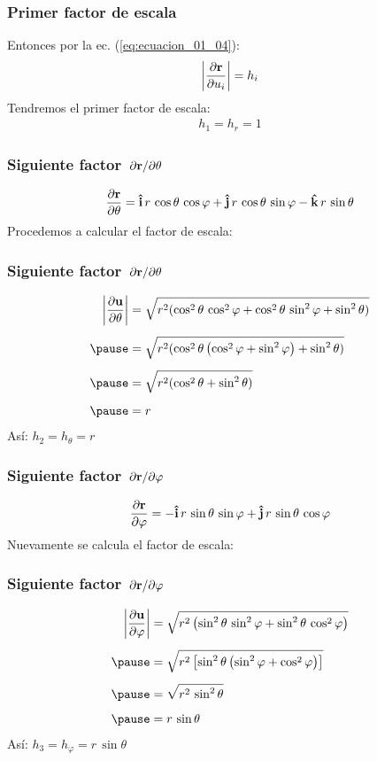 \documentclass[12pt]{beamer}
\begin{document}
\begin{frame}
\frametitle{Primer factor de escala}
Entonces por la ec. (\ref{eq:ecuacion_01_04}):
\pause
\begin{align*}
\abs{\pdv{\vb{r}}{u_{i}}} = h_{i}
\end{align*}
Tendremos el primer factor de escala:
\pause
\begin{align*}
h_{1} = h_{r} = 1
\end{align*}
\end{frame}
\begin{frame}
\frametitle{Siguiente factor $\pdv*{\vb{r}}{\theta}$}
\begin{align*}
\pdv{\vb{r}}{\theta} = \vu{i} \, r \, \cos \theta \, \cos \varphi + \vu{j} \, r \, \cos \theta \, \sin \varphi - \vu{k} \, r \, \sin \theta
\end{align*}
Procedemos a calcular el factor de escala:
\end{frame}
\begin{frame}
\frametitle{Siguiente factor $\pdv*{\vb{r}}{\theta}$}
\begin{eqnarray*}
\begin{aligned}
\abs{\pdv{\vb{u}}{\theta}} &= \sqrt{r^{2} (\cos^{2} \theta \, \cos^{2} \varphi + \cos^{2} \theta \, \sin^{2} \varphi + \sin^{2} \theta)} \\[0.5em] \pause
&= \sqrt{r^{2} (\cos^{2} \theta \left(\cos^{2} \varphi + \sin^{2} \varphi \right) + \sin^{2} \theta)} \\[0.5em] \pause
&= \sqrt{r^{2} (\cos^{2} \theta + \sin^{2} \theta)} \\[0.5em] \pause
&= r
\end{aligned}
\end{eqnarray*}
\pause
Así: $h_{2} = h_{\theta} = r$
\end{frame}
\begin{frame}
\frametitle{Siguiente factor $\pdv*{\vb{r}}{\varphi}$}
\begin{align*}
\pdv{\vb{r}}{\varphi} = - \vu{i} \, r \, \sin \theta \, \sin \varphi + \vu{j} \, r \, \sin \theta \, \cos \varphi
\end{align*}
Nuevamente se calcula el factor de escala:
\end{frame}
\begin{frame}
\frametitle{Siguiente factor $\pdv*{\vb{r}}{\varphi}$}
\begin{eqnarray*}
\begin{aligned}
\abs{\pdv{\vb{u}}{\varphi}} &= \sqrt{r^{2} \left( \sin^{2} \theta \, \sin^{2} \varphi + \sin^{2} \theta \, \cos^{2} \varphi \right)} \\[0.5em] \pause
&= \sqrt{r^{2} \left[ \sin^{2} \theta \left( \sin^{2} \varphi + \cos^{2} \varphi \right) \right]} \\[0.5em] \pause
&= \sqrt{r^{2} \, \sin^{2} \theta} \\[0.5em] \pause
&= r \, \sin \theta
\end{aligned}
\end{eqnarray*}
\pause
Así: $h_{3} = h_{\varphi} = r \, \sin \theta$
\end{frame}
\end{document}
